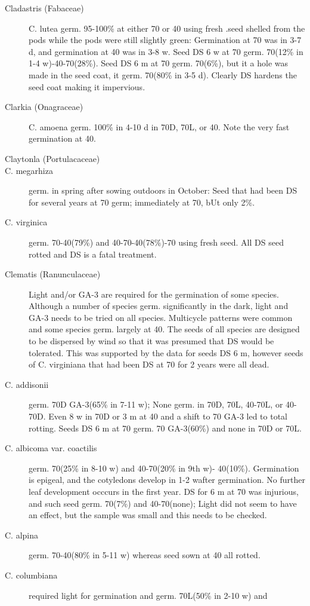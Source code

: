 \begin{description}
\item [Cladastris (Fabaceae)] C. lutea germ. 95-100\% at either 70 or 40 using
fresh .seed shelled from the pods while the pods were still slightly green: Germination
at 70 was in 3-7 d, and germination at 40 was in 3-8 w. Seed DS 6 w at 70 germ.
70(12\% in 1-4 w)-40-70(28\%). Seed DS 6 m at 70 germ. 70(6\%), but it a hole was
made in the seed coat, it germ. 70(80\% in 3-5 d). Clearly DS hardens the seed coat
making it impervious.
\item [Clarkia (Onagraceae)] C. amoena germ. 100\% in 4-10 d in 70D, 70L, or
40. Note the very fast germination at 40.

\item [Claytonla (Portulacaceae)]
\item [C. megarhiza] germ. in spring after sowing outdoors in October: Seed that had
been DS for several years at 70 germ; immediately at 70, bUt only 2\%.
\item [C. virginica] germ. 70-40(79\%) and 40-70-40(78\%)-70 using fresh seed. All DS
seed rotted and DS is a fatal treatment.
\item [Clematis (Ranunculaceae)] Light and/or GA-3 are required for the
germination of some species. Although a number of species germ. significantly in the
dark, light and GA-3 needs to be tried on all species. Multicycle patterns were
common and some species germ. largely at 40. The seeds of all species are designed
to be dispersed by wind so that it was presumed that DS would be tolerated. This was
supported by the data for seeds DS 6 m, however seeds of C. virginiana that had been
DS at 70 for 2 years were all dead.
\item [C. addisonii] germ. 70D GA-3(65\% in 7-11 w); None germ. in 70D, 70L, 40-70L,
or 40-70D. Even 8 w in 70D or 3 m at 40 and a shift to 70 GA-3 led to total rotting.
Seeds DS 6 m at 70 germ. 70 GA-3(60\%) and none in 70D or 70L.
\item [C. albicoma var. coactilis] germ. 70(25\% in 8-10 w) and 40-70(20\% in 9th w)-
40(10\%). Germination is epigeal, and the cotyledons develop in 1-2 wafter
germination. No further leaf development occcurs in the first year. DS for 6 m at 70
was injurious, and such seed germ. 70(7\%) and 40-70(none); Light did not seem to
have an effect, but the sample was small and this needs to be checked.
\item [C. alpina] germ. 70-40(80\% in 5-11 w) whereas seed sown at 40 all rotted.
\item [C. columbiana] required light for germination and germ. 70L(50\% in 2-10 w) and

\end{description}
